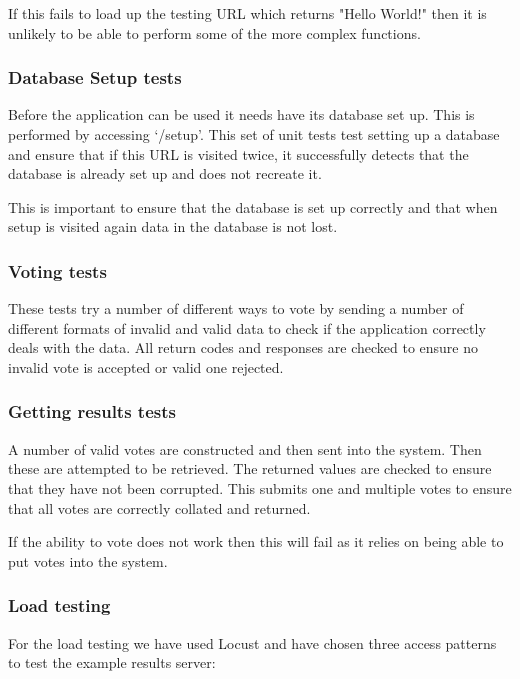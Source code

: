 If this fails to load up the testing URL which returns "Hello World!" then it is unlikely to be able to perform some of the more complex functions.

\subsubsection{Database Setup tests}

Before the application can be used it needs have its database set up. This is performed by accessing `/setup'. This set of unit tests test setting up a database and ensure that if this URL is visited twice, it successfully detects that the database is already set up and does not recreate it. 

This is important to ensure that the database is set up correctly and that when setup is visited again data in the database is not lost.

\subsubsection{Voting tests}

These tests try a number of different ways to vote by sending a number of different formats of invalid and valid data to check if the application correctly deals with the data. All return codes and responses are checked to ensure no invalid vote is accepted or valid one rejected.

\subsubsection{Getting results tests}

A number of valid votes are constructed and then sent into the system. Then these are attempted to be retrieved. The returned values are checked to ensure that they have not been corrupted. This submits one and multiple votes to ensure that all votes are correctly collated and returned.

If the ability to vote does not work then this will fail as it relies on being able to put votes into the system.

\subsubsection{Load testing}

For the load testing we have used Locust and have chosen three access patterns to test the example results server:

